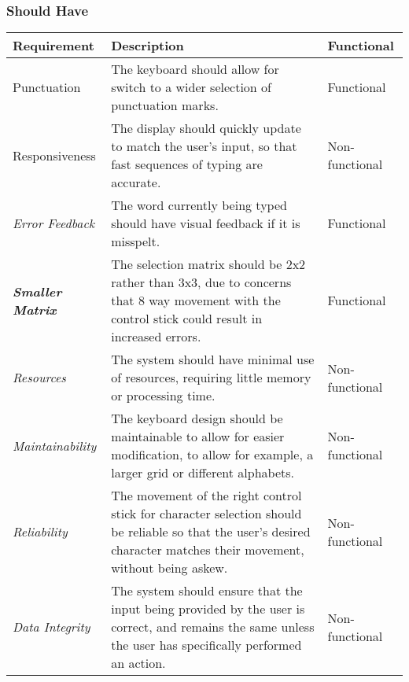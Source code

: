 \documentclass[requirements.tex]{subfiles}
\begin{document}
\subsubsection{Should Have} %
\label{ssub:after_should_have}
\begin{table}[H]
\scriptsize
\begin{tabularx}{\textwidth}{| l | X | l |}
 \hline
 \textbf{Requirement} & \textbf{Description} & \textbf{Functional} \\
 \hline
 Punctuation & The keyboard should allow for switch to a wider selection of
 punctuation marks. & Functional \\
 \hline
 Responsiveness & The display should quickly update to match the user's input,
 so that fast sequences of typing are accurate. & Non-functional \\
 \hline
 \emph{Error Feedback} & The word currently being typed should have visual
 feedback if it is misspelt. & Functional \\
 \hline
 \textbf{\emph{Smaller Matrix}} & The selection matrix should be 2x2 rather than
 3x3, due to concerns that 8 way movement with the control stick could result
 in increased errors. & Functional \\
 \hline
 \emph{Resources} & The system should have minimal use of resources, requiring
 little memory or processing time. & Non-functional \\
 \hline
 \emph{Maintainability} & The keyboard design should be maintainable to allow
 for easier modification, to allow for example, a larger grid or different
 alphabets. & Non-functional \\
 \hline
 \emph{Reliability} & The movement of the right control stick for character
 selection should be reliable so that the user's desired character matches their
 movement, without being askew. & Non-functional \\
 \hline
 \emph{Data Integrity} & The system should ensure that the input being provided
 by the user is correct, and remains the same unless the user has specifically
 performed an action. & Non-functional \\
 \hline
\end{tabularx}
\end{table}
\end{document}
